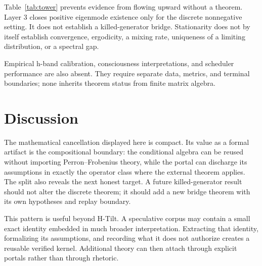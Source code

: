 \documentclass[11pt]{article}
\begin{document}


Table~\ref{tab:tower} prevents evidence from flowing upward without a theorem.
Layer 3 closes positive eigenmode existence only for the discrete nonnegative
setting. It does not establish a killed-generator bridge. Stationarity does not
by itself establish convergence, ergodicity, a mixing rate, uniqueness of a
limiting distribution, or a spectral gap.

Empirical h-band calibration, consciousness interpretations, and scheduler
performance are also absent. They require separate data, metrics, and terminal
boundaries; none inherits theorem status from finite matrix algebra.

\section{Discussion}

The mathematical cancellation displayed here is compact. Its value as a
formal artifact is the compositional boundary: the conditional algebra can be
reused without importing Perron--Frobenius theory, while the portal can
discharge its assumptions in exactly the operator class where the external
theorem applies. The split also reveals the next honest target. A future
killed-generator result should not alter the discrete theorem; it should add a
new bridge theorem with its own hypotheses and replay boundary.

This pattern is useful beyond H-Tilt. A speculative corpus may contain a small
exact identity embedded in much broader interpretation. Extracting that
identity, formalizing its assumptions, and recording what it does not authorize
creates a reusable verified kernel. Additional theory can then attach through
explicit portals rather than through rhetoric.

\appendix

\end{document}
